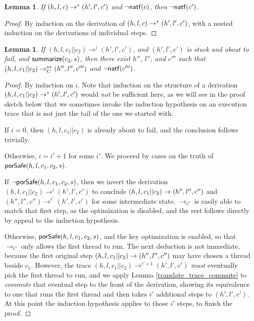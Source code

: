 \documentclass{amsbook}
\newtheorem{lemma}[theorem]{Lemma}
\theoremstyle{definition}
\theoremstyle{remark}
\numberwithin{section}{chapter}
\numberwithin{equation}{chapter}
\begin{document}
\begin{lemma}\label{stillFailing}
  If $(h, l, c) \to^* (h', l', c')$ and $\neg \mathsf{natf}(c)$, then $\neg \mathsf{natf}(c')$.
\end{lemma}
\begin{proof}
  By induction on the derivation of $(h, l, c) \to^* (h', l', c')$, with a nested induction on the derivations of individual steps.
\end{proof}

\begin{lemma}\label{translate_trace}
  If $(h, l, c_1 || c_2) \to^i (h', l', c')$, and $(h', l', c')$ is stuck and about to fail, and $\mathsf{summarize}(c_2, s)$, then there exist $h''$, $l''$, and $c'''$ such that $(h, l, c_1 || c_2) \to_C^{s*} (h'', l'', c''')$ and $\neg \mathsf{natf}(c''')$.
\end{lemma}
\begin{proof}
  By induction on $i$.
  Note that induction on the structure of a derivation $(h, l, c_1 || c_2) \to^* (h', l', c')$ would \emph{not} be sufficient here, as we will see in the proof sketch below that we sometimes invoke the induction hypothesis on an execution trace that is not just the tail of the one we started with.

  If $i = 0$, then $(h, l, c_1 || c_2)$ is already about to fail, and the conclusion follows trivially.

  Otherwise, $i = i' + 1$ for some $i'$.
  We proceed by cases on the truth of $\mathsf{porSafe}(h, l, c_1, c_2, s)$.

  If $\neg \mathsf{porSafe}(h, l, c_1, c_2, s)$, then we invert the derivation $(h, l, c_1 || c_2) \to^i (h', l', c')$ to conclude $(h, l, c_1 || c_2) \to (h'', l'', c'')$ and $(h'', l'', c'') \to^{i'} (h', l', c')$ for some intermediate state.
  $\to_C$ is easily able to match that first step, as the optimization is disabled, and the rest follows directly by appeal to the induction hypothesis.

  Otherwise, $\mathsf{porSafe}(h, l, c_1, c_2, s)$, and the key optimization is enabled, so that $\to_C$ only allows the first thread to run.
  The next deduction is not immediate, because the first original step $(h, l, c_1 || c_2) \to (h'', l'', c'')$ may have chosen a thread beside $c_1$.
  However, the trace $(h, l, c_1 || c_2) \to^{i'+1} (h', l', c')$ \emph{must} eventually pick the first thread to run, and we apply Lemma \ref{translate_trace_commute} to \emph{commute} that eventual step to the front of the derivation, showing its equivalence to one that runs the first thread and then takes $i'$ additional steps to $(h', l', c')$.
  At this point the induction hypothesis applies to those $i'$ steps, to finish the proof.
\end{proof}
\end{document}
